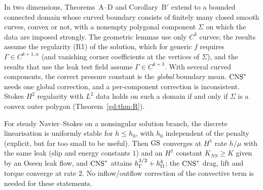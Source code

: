 \begin{theoremG}
In two dimensions, Theorems~A--D and Corollary~B$'$ extend to a bounded connected domain whose curved boundary consists of finitely many closed smooth curves, convex or not, with a nonempty polygonal component $\Sigma$ on which the data are imposed strongly. The geometric lemmas use only $C^3$ curves; the results assume the regularity (R1) of the solution, which for generic $f$ requires $\Gamma\in C^{k+1,\alpha}$ (and vanishing corner coefficients at the vertices of $\Sigma$), and the results that use the leak test field assume $\Gamma\in C^{k+3}$. With several curved components, the correct pressure constant is the \emph{global} boundary mean. $\mathrm{CNS}^\ast$ needs one global correction, and a per-component correction is inconsistent. Stokes $H^2$ regularity with $L^2$ data holds on such a domain if and only if $\Sigma$ is a convex outer polygon (Theorem~\ref{gd:thm:R}).
\end{theoremG}

\begin{theoremH}
For steady Navier--Stokes on a nonsingular solution branch, the discrete linearisation is uniformly stable for $h\le h_0$, with $h_0$ independent of the penalty (explicit, but far too small to be useful). Then $\mathrm{GS}$ converges at $H^1$ rate $h/\mu$ with the same leak (slip and energy constants $1$) and an $H^1$ constant $K_{NS}\ge K$ given by an Oseen leak flow, and $\mathrm{CNS}^\ast$ attains $h_\Gamma^{3/2}+h_\Omega^k$; the $\mathrm{CNS}^\ast$ drag, lift and torque converge at rate $2$. No inflow/outflow correction of the convective term is needed for these statements.
\end{theoremH}

